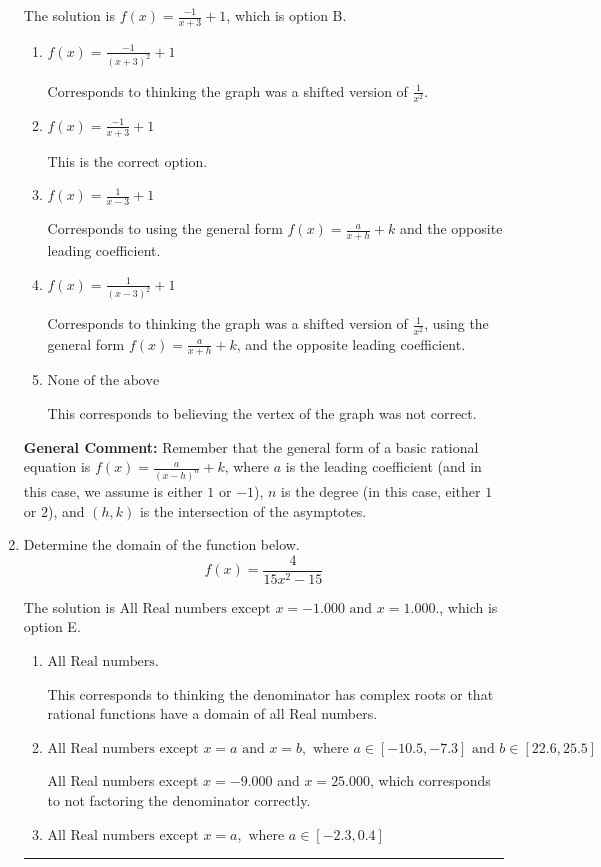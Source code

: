 \documentclass{extbook}[14pt]
\newcommand{\litem}[1]{\item #1

\rule{\textwidth}{0.4pt}}
\begin{document}
\begin{enumerate}
{The solution is \( f(x) = \frac{-1}{x + 3} + 1 \), which is option B.\begin{enumerate}[label=\Alph*.]
\item \( f(x) = \frac{-1}{(x + 3)^2} + 1 \)

Corresponds to thinking the graph was a shifted version of $\frac{1}{x^2}$.
\item \( f(x) = \frac{-1}{x + 3} + 1 \)

This is the correct option.
\item \( f(x) = \frac{1}{x - 3} + 1 \)

Corresponds to using the general form $f(x) = \frac{a}{x+h}+k$ and the opposite leading coefficient.
\item \( f(x) = \frac{1}{(x - 3)^2} + 1 \)

Corresponds to thinking the graph was a shifted version of $\frac{1}{x^2}$, using the general form $f(x) = \frac{a}{x+h}+k$, and the opposite leading coefficient.
\item \( \text{None of the above} \)

This corresponds to believing the vertex of the graph was not correct.
\end{enumerate}

\textbf{General Comment:} Remember that the general form of a basic rational equation is $ f(x) = \frac{a}{(x-h)^n} + k$, where $a$ is the leading coefficient (and in this case, we assume is either $1$ or $-1$), $n$ is the degree (in this case, either $1$ or $2$), and $(h, k)$ is the intersection of the asymptotes.
}
\litem{
Determine the domain of the function below.
\[ f(x) = \frac{4}{15x^{2} -15} \]

The solution is \( \text{All Real numbers except } x = -1.000 \text{ and } x = 1.000. \), which is option E.\begin{enumerate}[label=\Alph*.]
\item \( \text{All Real numbers.} \)

This corresponds to thinking the denominator has complex roots or that rational functions have a domain of all Real numbers.
\item \( \text{All Real numbers except } x = a \text{ and } x = b, \text{ where } a \in [-10.5, -7.3] \text{ and } b \in [22.6, 25.5] \)

All Real numbers except $x = -9.000$ and $x = 25.000$, which corresponds to not factoring the denominator correctly.
\item \( \text{All Real numbers except } x = a, \text{ where } a \in [-2.3, 0.4] \)


\end{enumerate}}
\end{enumerate}
\end{document}
